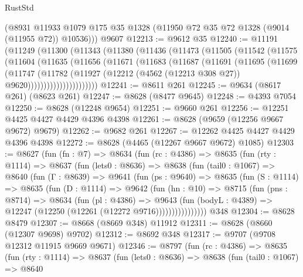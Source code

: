 \begin{lexlean}{RustStd}
\begin{coremodule}
      (@8931 @11933 @1079 @175 @35 @1328 (@11950 @72 @35 @72 @1328 (@9014 (@11955 @72)) @10536)))
    @9607
@12213 := @9612 @35
@12240 := @11191
    (@11249
      (@11300
        (@11343
          (@11380
            (@11436
              (@11473
                (@11505
                  (@11542
                    (@11575
                      (@11604
                        (@11635
                          (@11656
                            (@11671
                              (@11683
                                (@11687
                                  (@11691
                                    (@11695
                                      (@11699
                                        (@11747
                                          (@11782
                                            (@11927
                                              (@12212
                                                (@4562 (@12213 @308 @27))
                                                @9620))))))))))))))))))))))
@12241 := @8611 @261
@12245 := @9634 (@8617 @261) (@8623 @261)
@12247 := @8628 (@8477 @9645)
@12248 := @4393 @7054
@12250 := @8628 (@12248 @9654)
@12251 := @9660 @261
@12256 := @12251 @4425 @4427 @4429 @4396 @4398
@12261 := @8628 (@9659 (@12256 @9667 @9672) @9679)
@12262 := @9682 @261
@12267 := @12262 @4425 @4427 @4429 @4396 @4398
@12272 := @8628 (@4465 (@12267 @9667 @9672) @1085)
@12303 := @8627
    (fun (fn : @7) =>
    @8634
      (fun (rc : @4386) =>
      @8635
        (fun (rty : @1114) =>
        @8637
          (fun (lets0 : @8636) =>
          @8638
            (fun (tail0 : @1067) =>
            @8640
              (fun (Γ : @8639) =>
              @9641
                (fun (ps : @9640) =>
                @8635
                  (fun (S : @1114) =>
                  @8635
                    (fun (D : @1114) =>
                    @9642
                      (fun (hn : @10) =>
                      @8715
                        (fun (pns : @8714) =>
                        @8634
                          (fun (pl : @4386) =>
                          @9643
                            (fun (bodyL : @4389) =>
                            @12247 (@12250 (@12261 (@12272 @9716))))))))))))))))
    @348
@12304 := @8628 @8479
@12307 := @8668 (@8669 @348) @11912
@12311 := @8628 (@8660 (@12307 @9698) @9702)
@12312 := @8692 @348
@12317 := @9707 (@9708 @12312 @11915 @9669 @9671)
@12346 := @8797
    (fun (rc : @4386) =>
    @8635
      (fun (rty : @1114) =>
      @8637
        (fun (lets0 : @8636) =>
        @8638
          (fun (tail0 : @1067) =>
          @8640

\end{coremodule}
\end{lexlean}
